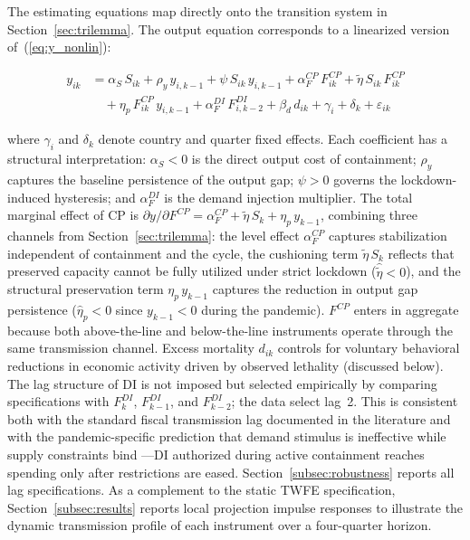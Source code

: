 \documentclass[12pt, a4paper]{article}
\begin{document}

The estimating equations map directly onto the transition system in
Section~\ref{sec:trilemma}. The output equation corresponds to a linearized version
of~(\ref{eq:y_nonlin}):


\begin{equation}
\begin{split}
    y_{ik} &= \alpha_S\, S_{ik} + \rho_y\, y_{i,k-1}
    + \psi\, S_{ik}\, y_{i,k-1}
    + \alpha_F^{CP}\, F_{ik}^{CP}
    + \tilde{\eta}\, S_{ik}\, F_{ik}^{CP} \\
    &\quad + \eta_p\, F_{ik}^{CP}\, y_{i,k-1}
    + \alpha_F^{DI}\, F_{i,k-2}^{DI}
    + \beta_d\, d_{ik}
    + \gamma_i + \delta_k + \varepsilon_{ik}
\end{split}
    \label{eq:output_est}
\end{equation}


where $\gamma_i$ and $\delta_k$ denote country and quarter fixed effects. Each coefficient has a structural interpretation: $\alpha_S < 0$ is the direct output cost of containment; $\rho_y$ captures the baseline persistence of the output gap; $\psi > 0$ governs the lockdown-induced hysteresis; and $\alpha_F^{DI}$ is the demand injection multiplier. The total marginal effect of CP is $\partial y / \partial F^{CP} = \alpha_F^{CP} + \tilde{\eta}\, S_k
+ \eta_p\, y_{k-1}$, combining three channels from
Section~\ref{sec:trilemma}: the level effect $\alpha_F^{CP}$ captures stabilization independent of containment and the cycle, the cushioning term
$\tilde{\eta}\, S_k$ reflects that preserved capacity cannot be fully utilized under strict lockdown ($\hat{\tilde{\eta}} < 0$), and the structural preservation term $\eta_p\, y_{k-1}$ captures the reduction in output gap persistence ($\hat{\eta}_p < 0$ since $y_{k-1} < 0$ during the pandemic).
$F^{CP}$ enters in aggregate because both above-the-line and below-the-line instruments operate through the same transmission channel. Excess mortality
$d_{ik}$ controls for voluntary behavioral reductions in economic activity driven by observed lethality (discussed below). The lag structure of DI is not imposed but selected empirically by comparing specifications with $F_{k}^{DI}$, $F_{k-1}^{DI}$, and $F_{k-2}^{DI}$; the data select lag~2. This is consistent both with the standard fiscal
transmission lag documented in the literature \citep{Blanchard2002, Ramey2011}
and with the pandemic-specific prediction that demand stimulus is ineffective
while supply constraints bind \citep{guerrieri2022}---DI authorized during
active containment reaches spending only after restrictions are eased.
Section~\ref{subsec:robustness} reports all lag specifications.
As a complement to the static TWFE specification, Section~\ref{subsec:results}
reports local projection impulse responses \citep{JordaTaylor2025} to illustrate the
dynamic transmission profile of each instrument over a four-quarter horizon.
\end{document}
